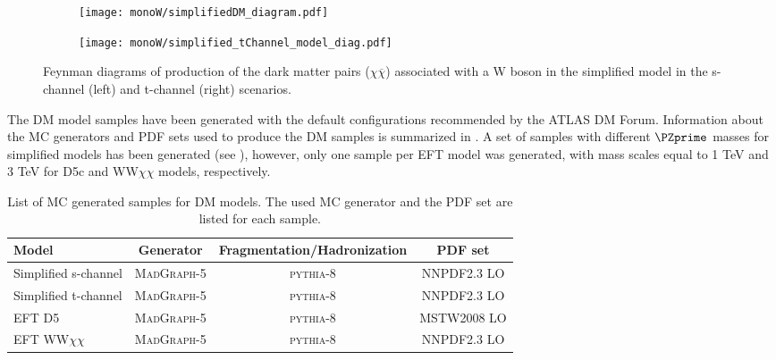 \begin{figure}[]

\centering
\begin{subfigure}{.5\textwidth}
  \centering
  \texttt{[image: monoW/simplifiedDM\_diagram.pdf]}
\end{subfigure}%
\begin{subfigure}{.5\textwidth}
  \centering
  \texttt{[image: monoW/simplified\_tChannel\_model\_diag.pdf]}
\end{subfigure}
  \caption{Feynman diagrams of production of the dark matter pairs ($\chi\overline{\chi}$) associated with a W boson in the simplified model 
	   in the s-channel (left) and t-channel (right) scenarios.}
  \label{fig:feynMonoWSimple}
\end{figure}

The DM model samples have been generated with the default configurations recommended by the ATLAS DM Forum. Information about the MC generators and PDF sets used to produce the DM samples is summarized in .
A set of samples with different $\PZprime$ masses for simplified models has been generated (see ),
however, only one sample per EFT model was generated, with mass scales equal to 1 TeV and 3 TeV for D5c and WW$\chi\chi$ models, respectively.

\begin{table}[ht]
  \begin{center}
    \begin{tabular}{l|c|c|c}

Model &  Generator & Fragmentation/Hadronization  & PDF set \\
\hline\hline
Simplified s-channel & M{\scshape ad}G{\scshape raph}-5 & {\scshape pythia-8} & NNPDF2.3 LO \\
Simplified t-channel & M{\scshape ad}G{\scshape raph}-5 & {\scshape pythia-8} & NNPDF2.3 LO \\
EFT D5 & M{\scshape ad}G{\scshape raph}-5 & {\scshape pythia-8} & MSTW2008 LO \\
EFT WW$\chi\chi$ & M{\scshape ad}G{\scshape raph}-5 & {\scshape pythia-8} & NNPDF2.3 LO \\

\end{tabular}
\end{center}
  \caption{List of MC generated samples for DM models. The used MC generator and the PDF set are listed for each sample.
  }
\label{tab:monoW_samples}
\end{table}

